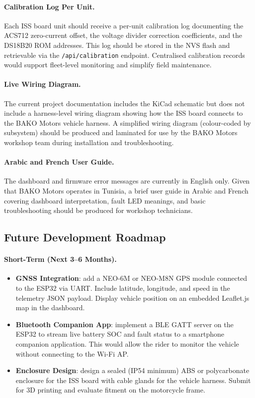 \paragraph{Calibration Log Per Unit.}
Each ISS board unit should receive a per-unit calibration log documenting the ACS712 zero-current offset, the voltage divider correction coefficients, and the DS18B20 ROM addresses. This log should be stored in the NVS flash and retrievable via the \texttt{/api/calibration} endpoint. Centralised calibration records would support fleet-level monitoring and simplify field maintenance.

\paragraph{Live Wiring Diagram.}
The current project documentation includes the KiCad schematic but does not include a harness-level wiring diagram showing how the ISS board connects to the BAKO Motors vehicle harness. A simplified wiring diagram (colour-coded by subsystem) should be produced and laminated for use by the BAKO Motors workshop team during installation and troubleshooting.

\paragraph{Arabic and French User Guide.}
The dashboard and firmware error messages are currently in English only. Given that BAKO Motors operates in Tunisia, a brief user guide in Arabic and French covering dashboard interpretation, fault LED meanings, and basic troubleshooting should be produced for workshop technicians.

\subsection{Future Development Roadmap}

\paragraph{Short-Term (Next 3--6 Months).}
\begin{itemize}
    \item \textbf{GNSS Integration}: add a NEO-6M or NEO-M8N GPS module connected to the ESP32 via UART. Include latitude, longitude, and speed in the telemetry JSON payload. Display vehicle position on an embedded Leaflet.js map in the dashboard.
    \item \textbf{Bluetooth Companion App}: implement a BLE GATT server on the ESP32 to stream live battery SOC and fault status to a smartphone companion application. This would allow the rider to monitor the vehicle without connecting to the Wi-Fi AP.
    \item \textbf{Enclosure Design}: design a sealed (IP54 minimum) ABS or polycarbonate enclosure for the ISS board with cable glands for the vehicle harness. Submit for 3D printing and evaluate fitment on the motorcycle frame.
\end{itemize}

